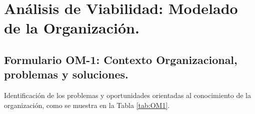 

\chapter{Análisis de Viabilidad: Modelado de la Organización.}

\newpage
\section{Formulario OM-1: Contexto Organizacional, problemas y soluciones.}
Identificación de los problemas y oportunidades orientadas al conocimiento de la organización, como se muestra en la Tabla \ref{tab:OM1}.


